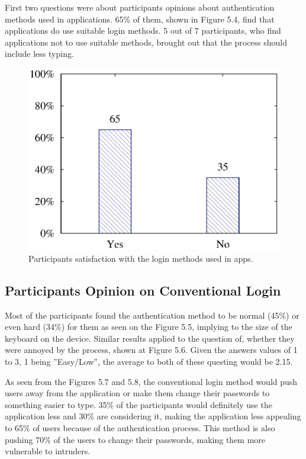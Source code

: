 First two questions were about participants opinions about authentication methods used in applications. 65\% of them, shown in Figure 5.4, find that applications do use suitable login methods. 5 out of 7 participants, who find applications not to use suitable methods, brought out that the process should include less typing. 

\begin{figure}[H]
\centering
\includegraphics[scale=.7]{files/question1/question1.eps}
\caption{Participants satisfaction with the login methods used in apps.}
\label{fig:digraph}
\end{figure}

\subsection{Participants Opinion on Conventional Login}
Most of the participants found the authentication method to be normal (45\%) or even hard (34\%) for them as seen on the Figure 5.5, implying to the size of the keyboard on the device. Similar results applied to the question of, whether they were annoyed by the process, shown at Figure 5.6. Given the answers values of 1 to 3, 1 being ''Easy/Low'', the average to both of these questing would be 2.15. 

As seen from the Figures 5.7 and 5.8, the conventional login method would push users away from the application or make them change their passwords to something easier to type. 35\% of the participants would definitely use the application less and 30\% are considering it, making the application less appealing to 65\% of users because of the authentication process. This method is also pushing 70\% of the  users to change their passwords, making them more vulnerable to intruders.  

